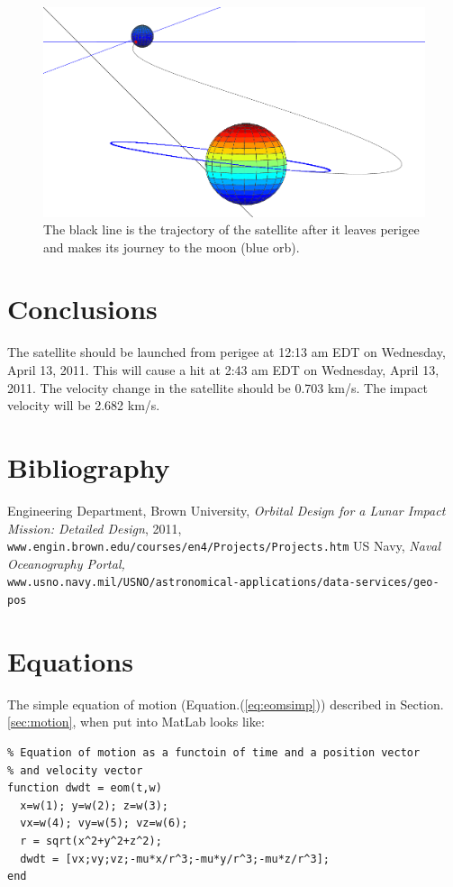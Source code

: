 \documentclass{article}
\begin{document}
\begin{figure}[H]\centering
  \includegraphics[width=\textwidth]{impact2.png}
  \caption{The black line is the trajectory of the satellite after it
    leaves perigee and makes its journey to the moon (blue orb).}
  \label{fig:impact}
\end{figure}

\section{Conclusions}

The satellite should be launched from perigee at 12:13 am EDT on
Wednesday, April 13, 2011. This will cause a hit at 2:43 am EDT on
Wednesday, April 13, 2011. The velocity change in the satellite should
be 0.703 km/s. The impact velocity will be 2.682 km/s.

\pagebreak
\section{Bibliography}
\begin{thebibliography}{99}
   Engineering Department, Brown University,
    \textsl{Orbital Design for a Lunar Impact Mission: Detailed
Design}, 2011, \\
    {\small
      \texttt{www.engin.brown.edu/courses/en4/Projects/Projects.htm}}
  US Navy,
    \textsl{Naval Oceanography Portal,}\\
    {\small
      \texttt{www.usno.navy.mil/USNO/astronomical-applications/data-services/geo-
        pos}}
\end{thebibliography}


\pagebreak

\appendix
\section{Equations}\label{sec:eomcode}
The simple equation of motion (Equation.(\ref{eq:eomsimp})) described
in Section.\ref{sec:motion}, when put into MatLab looks like:
\begin{verbatim}
% Equation of motion as a functoin of time and a position vector
% and velocity vector
function dwdt = eom(t,w)
  x=w(1); y=w(2); z=w(3);
  vx=w(4); vy=w(5); vz=w(6);
  r = sqrt(x^2+y^2+z^2);
  dwdt = [vx;vy;vz;-mu*x/r^3;-mu*y/r^3;-mu*z/r^3];
end
\end{verbatim}
\end{document}
